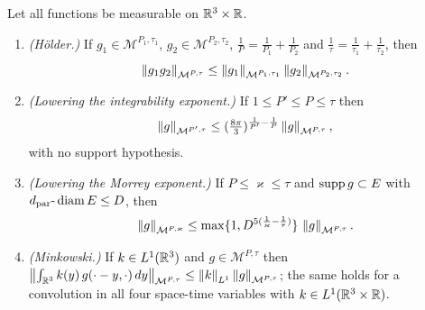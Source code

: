 \documentclass[11pt,reqno]{amsart}
\begin{document}
\begin{lemma}\label{lem:morrey-minkowski}
Let all functions be measurable on $\mathbb{R}^{3}\times\mathbb{R}$.
\begin{enumerate}
\item[(i)] \emph{(H\"older.)} If $g_{1}\in\mathcal{M}^{P_{1},\tau_{1}}$,
  $g_{2}\in\mathcal{M}^{P_{2},\tau_{2}}$,
  $\tfrac1P=\tfrac1{P_{1}}+\tfrac1{P_{2}}$ and
  $\tfrac1\tau=\tfrac1{\tau_{1}}+\tfrac1{\tau_{2}}$, then
  \begin{equation}\label{eq:morrey-holder}
    \left\lVert g_{1}g_{2} \right\rVert_{\mathcal{M}^{P,\tau}}
    \le\left\lVert g_{1} \right\rVert_{\mathcal{M}^{P_{1},\tau_{1}}}
       \left\lVert g_{2} \right\rVert_{\mathcal{M}^{P_{2},\tau_{2}}} .
  \end{equation}
\item[(ii)] \emph{(Lowering the integrability exponent.)} If
  $1\le P'\le P\le\tau$ then
\[
\left\lVert g \right\rVert_{\mathcal{M}^{P',\tau}}\le(\tfrac{8\pi}{3})^{\frac1{P'}-\frac1P}
   \left\lVert g \right\rVert_{\mathcal{M}^{P,\tau}}
,
\] with no support hypothesis.
\item[(iii)] \emph{(Lowering the Morrey exponent.)} If $P\le\varkappa\le\tau$ and
  $\operatorname{supp} g\subset E$ with $d_{\mathrm{par}}\text{-}\operatorname{diam} E\le D$, then
  \begin{equation}\label{eq:morrey-lower}
    \left\lVert g \right\rVert_{\mathcal{M}^{P,\varkappa}}
    \le\max\{1,D^{5(\frac1\varkappa-\frac1\tau)}\}\,
       \left\lVert g \right\rVert_{\mathcal{M}^{P,\tau}} .
  \end{equation}
\item[(iv)] \emph{(Minkowski.)} If $k\in L^{1}(\mathbb{R}^{3})$ and
  $g\in\mathcal{M}^{P,\tau}$ then
  $\bigl\|\int_{\mathbb{R}^{3}}k(y)\,g(\cdot-y,\cdot)\,dy\bigr\|_{\mathcal{M}^{P,\tau}}
   \le\left\lVert k \right\rVert_{L^{1}}\left\lVert g \right\rVert_{\mathcal{M}^{P,\tau}}$; the same holds for a
  convolution in all four space-time variables with $k\in L^{1}(\mathbb{R}^{3}\times\mathbb{R})$.
\end{enumerate}
\end{lemma}
\end{document}
